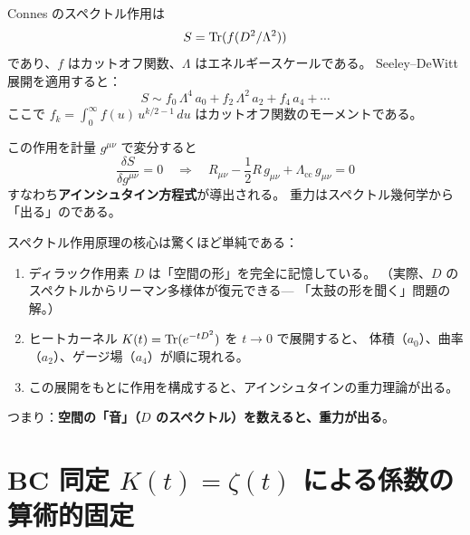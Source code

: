 \begin{keyresult}
Connes のスペクトル作用は
\begin{equation}
  S = \operatorname{Tr}(f(D^2/\Lambda^2))
  \label{eq:spectral-action}
\end{equation}
であり、$f$ はカットオフ関数、$\Lambda$ はエネルギースケールである。
Seeley--DeWitt 展開を適用すると：
\begin{equation}
  S \sim f_0\, \Lambda^4\, a_0 + f_2\, \Lambda^2\, a_2 + f_4\, a_4 + \cdots
  \label{eq:spectral-action-expanded}
\end{equation}
ここで $f_k = \int_0^{\infty} f(u)\, u^{k/2-1}\, du$ はカットオフ関数のモーメントである。

この作用を計量 $g^{\mu\nu}$ で変分すると
\begin{equation}
  \frac{\delta S}{\delta g^{\mu\nu}} = 0
  \quad \Longrightarrow \quad
  R_{\mu\nu} - \frac{1}{2} R\, g_{\mu\nu} + \Lambda_{\mathrm{cc}}\, g_{\mu\nu} = 0
\end{equation}
すなわち\textbf{アインシュタイン方程式}が導出される。
重力はスペクトル幾何学から「出る」のである。
\end{keyresult}

\begin{hsbox}
スペクトル作用原理の核心は驚くほど単純である：

\begin{enumerate}
  \item ディラック作用素 $D$ は「空間の形」を完全に記憶している。
        （実際、$D$ のスペクトルからリーマン多様体が復元できる---
        「太鼓の形を聞く」問題の解。）
  \item ヒートカーネル $K(t) = \operatorname{Tr}(e^{-tD^2})$ を $t \to 0$ で展開すると、
        体積（$a_0$）、曲率（$a_2$）、ゲージ場（$a_4$）が順に現れる。
  \item この展開をもとに作用を構成すると、アインシュタインの重力理論が出る。
\end{enumerate}

つまり：\textbf{空間の「音」（$D$ のスペクトル）を数えると、重力が出る}。
\end{hsbox}


\section{BC 同定 $K(t) = \zeta(t)$ による係数の算術的固定}
\label{sec:bc-fixing}

